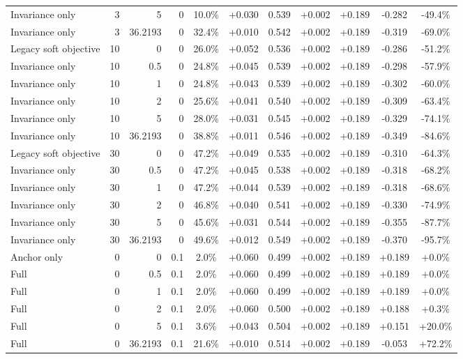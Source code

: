 \begin{table}[htbp]
\begin{tabular}{lrrrccccccc}
Invariance only & 3 & 5 & 0 & 10.0\% & +0.030 & 0.539 & +0.002 & +0.189 & -0.282 & -49.4\% \\
Invariance only & 3 & 36.2193 & 0 & 32.4\% & +0.010 & 0.542 & +0.002 & +0.189 & -0.319 & -69.0\% \\
Legacy soft objective & 10 & 0 & 0 & 26.0\% & +0.052 & 0.536 & +0.002 & +0.189 & -0.286 & -51.2\% \\
Invariance only & 10 & 0.5 & 0 & 24.8\% & +0.045 & 0.539 & +0.002 & +0.189 & -0.298 & -57.9\% \\
Invariance only & 10 & 1 & 0 & 24.8\% & +0.043 & 0.539 & +0.002 & +0.189 & -0.302 & -60.0\% \\
Invariance only & 10 & 2 & 0 & 25.6\% & +0.041 & 0.540 & +0.002 & +0.189 & -0.309 & -63.4\% \\
Invariance only & 10 & 5 & 0 & 28.0\% & +0.031 & 0.545 & +0.002 & +0.189 & -0.329 & -74.1\% \\
Invariance only & 10 & 36.2193 & 0 & 38.8\% & +0.011 & 0.546 & +0.002 & +0.189 & -0.349 & -84.6\% \\
Legacy soft objective & 30 & 0 & 0 & 47.2\% & +0.049 & 0.535 & +0.002 & +0.189 & -0.310 & -64.3\% \\
Invariance only & 30 & 0.5 & 0 & 47.2\% & +0.045 & 0.538 & +0.002 & +0.189 & -0.318 & -68.2\% \\
Invariance only & 30 & 1 & 0 & 47.2\% & +0.044 & 0.539 & +0.002 & +0.189 & -0.318 & -68.6\% \\
Invariance only & 30 & 2 & 0 & 46.8\% & +0.040 & 0.541 & +0.002 & +0.189 & -0.330 & -74.9\% \\
Invariance only & 30 & 5 & 0 & 45.6\% & +0.031 & 0.544 & +0.002 & +0.189 & -0.355 & -87.7\% \\
Invariance only & 30 & 36.2193 & 0 & 49.6\% & +0.012 & 0.549 & +0.002 & +0.189 & -0.370 & -95.7\% \\
Anchor only & 0 & 0 & 0.1 & 2.0\% & +0.060 & 0.499 & +0.002 & +0.189 & +0.189 & +0.0\% \\
Full & 0 & 0.5 & 0.1 & 2.0\% & +0.060 & 0.499 & +0.002 & +0.189 & +0.189 & +0.0\% \\
Full & 0 & 1 & 0.1 & 2.0\% & +0.060 & 0.499 & +0.002 & +0.189 & +0.189 & +0.0\% \\
Full & 0 & 2 & 0.1 & 2.0\% & +0.060 & 0.500 & +0.002 & +0.189 & +0.188 & +0.3\% \\
Full & 0 & 5 & 0.1 & 3.6\% & +0.043 & 0.504 & +0.002 & +0.189 & +0.151 & +20.0\% \\
Full & 0 & 36.2193 & 0.1 & 21.6\% & +0.010 & 0.514 & +0.002 & +0.189 & -0.053 & +72.2\% \\

\end{tabular}
\end{table}
